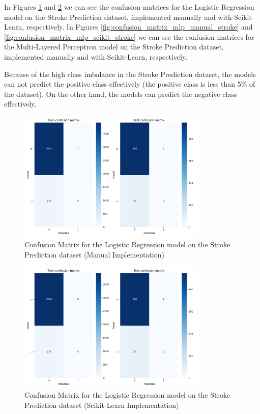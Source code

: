 \documentclass[runningheads]{paper}
\begin{document}
In Figures \ref{fig:confusion_matrix_logistic_manual_stroke} and
\ref{fig:confusion_matrix_logistic_scikit_stroke} we can see the confusion matrices
for the Logistic Regression model on the Stroke Prediction dataset, implemented
manually and with Scikit-Learn, respectively. In Figures
\ref{fig:confusion_matrix_mlp_manual_stroke} and \ref{fig:confusion_matrix_mlp_scikit_stroke}
we can see the confusion matrices for the Multi-Layered Perceptron model on the
Stroke Prediction dataset, implemented manually and with Scikit-Learn, respectively.

Because of the high class imbalance in the Stroke Prediction dataset, the models
can not predict the positive class effectively (the positive class is less than 5\%
of the dataset). On the other hand, the models can predict the negative class
effectively.

\begin{figure}[H]
    \centering
    \includegraphics[width=0.8\textwidth]{../tema2_AVC/LogisticRegression/confusion_matrix_manual.png}
    \caption{Confusion Matrix for the Logistic Regression model on the Stroke Prediction dataset (Manual Implementation)}
    \label{fig:confusion_matrix_logistic_manual_stroke}
\end{figure}

\begin{figure}[H]
    \centering
    \includegraphics[width=0.8\textwidth]{../tema2_AVC/LogisticRegression/confusion_matrix_scikit-learn.png}
    \caption{Confusion Matrix for the Logistic Regression model on the Stroke Prediction dataset (Scikit-Learn Implementation)}
    \label{fig:confusion_matrix_logistic_scikit_stroke}
\end{figure}
\end{document}
